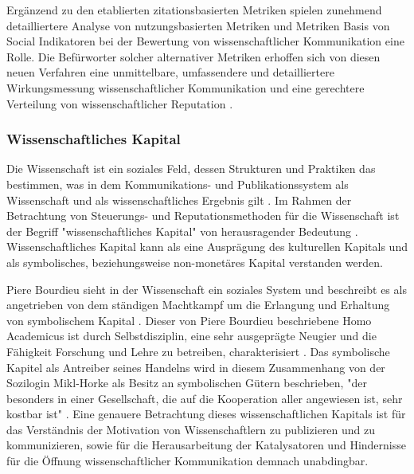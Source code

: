 Ergänzend zu den etablierten zitationsbasierten Metriken spielen zunehmend detailliertere Analyse von nutzungsbasierten Metriken und Metriken Basis von Social Indikatoren \cite{peters_2015_research} bei der Bewertung von wissenschaftlicher Kommunikation eine Rolle. Die Befürworter solcher alternativer Metriken erhoffen sich von diesen neuen Verfahren eine unmittelbare, umfassendere und detailliertere Wirkungsmessung wissenschaftlicher Kommunikation und eine gerechtere Verteilung von wissenschaftlicher Reputation \cite{peters_2015_research} \cite{cite:17} \cite{dora_2013}.

\subsubsection{Wissenschaftliches Kapital}

Die Wissenschaft ist ein soziales Feld, dessen Strukturen und Praktiken das bestimmen, was in dem Kommunikations- und Publikationssystem als Wissenschaft und als wissenschaftliches Ergebnis gilt \cite{mikl_2010_soziologie}. Im Rahmen der Betrachtung von Steuerungs- und Reputationsmethoden für die Wissenschaft ist der Begriff "wissenschaftliches Kapital" von herausragender Bedeutung \cite{Barl_sius_2008}. Wissenschaftliches Kapital kann als eine Ausprägung des kulturellen Kapitals und als symbolisches, beziehungsweise non-monetäres Kapital \cite{irmer2011} \cite{hagner_2015_sache_buches} \cite{bourdieu_1988_homo} verstanden werden.

Piere Bourdieu sieht in der Wissenschaft ein soziales System und beschreibt es als angetrieben von dem ständigen Machtkampf um die Erlangung und Erhaltung von symbolischem Kapital \cite{bourdieu_1988_homo}. Dieser von Piere Bourdieu beschriebene Homo Academicus ist durch Selbstdisziplin, eine sehr ausgeprägte Neugier und die Fähigkeit Forschung und Lehre zu betreiben, charakterisiert \cite{bourdieu_1988_homo}. Das symbolische Kapitel als Antreiber seines Handelns wird in diesem Zusammenhang von der Sozilogin Mikl-Horke als Besitz an symbolischen Gütern beschrieben, "der besonders in einer Gesellschaft, die auf die Kooperation aller angewiesen ist, sehr kostbar ist" \cite{mikl_2010_soziologie}. Eine genauere Betrachtung dieses wissenschaftlichen Kapitals ist für das Verständnis der Motivation von Wissenschaftlern zu publizieren und zu kommunizieren, sowie für die Herausarbeitung der Katalysatoren und Hindernisse für die Öffnung wissenschaftlicher Kommunikation demnach unabdingbar.

